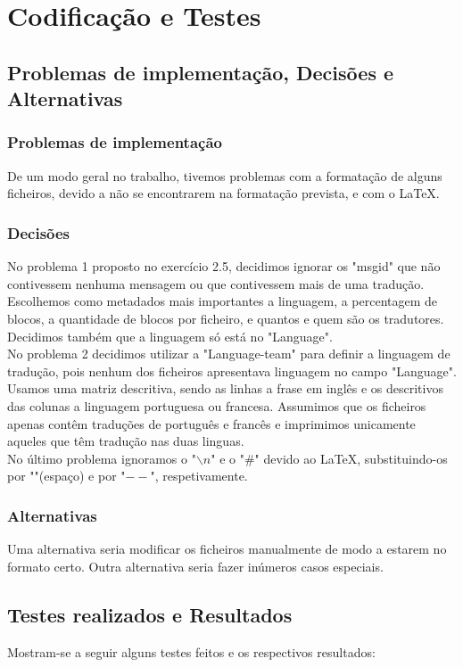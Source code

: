 \documentclass{report}
\begin{document}
\chapter{Codificação e Testes}
\section{Problemas de implementação, Decisões e Alternativas}
\subsection{Problemas de implementação}
De um modo geral no trabalho, tivemos problemas com a formatação de alguns ficheiros, devido a não se encontrarem na formatação prevista, e com o \LaTeX.
\subsection{Decisões}
No problema 1 proposto no exercício 2.5, decidimos ignorar os "msgid" que não contivessem nenhuma mensagem ou que contivessem mais de uma tradução. Escolhemos como metadados mais importantes a linguagem, a percentagem de blocos, a quantidade de blocos por ficheiro, e quantos e quem são os tradutores. Decidimos também que a linguagem só está no "Language".\\
No problema 2 decidimos utilizar a "Language-team" para definir a linguagem de tradução, pois nenhum dos ficheiros apresentava linguagem no campo "Language". Usamos uma matriz descritiva, sendo as linhas a frase em inglês e os descritivos das colunas a linguagem portuguesa ou francesa. Assumimos que os ficheiros apenas contêm traduções de português e francês e imprimimos unicamente aqueles que têm tradução nas duas linguas.\\
No último problema ignoramos o "$\backslash n$" e o "\#" devido ao \LaTeX, substituindo-os por "$ $"(espaço) e por "$--$", respetivamente.
\subsection{Alternativas}
Uma alternativa seria modificar os ficheiros manualmente de modo a estarem no formato certo. Outra alternativa seria fazer inúmeros casos especiais.

\section{Testes realizados e Resultados}
Mostram-se a seguir alguns testes feitos e os respectivos resultados:
\end{document}
